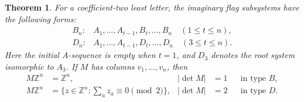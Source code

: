 \documentclass[11pt]{amsart}
\numberwithin{equation}{section}
\newtheorem{theorem}{Theorem}[section]
\theoremstyle{definition}
\newcommand{\Z}{\mathbb Z}
\begin{document}
\begin{theorem}\label{thm:orthogonal-flags}
For a coefficient-two least letter, the imaginary flag subsystems have the following forms:
\[
 \begin{array}{ll}
 B_n:&A_1,\ldots,A_{t-1},B_t,\ldots,B_n\quad(1\leq t\leq n),\\
 D_n:&A_1,\ldots,A_{t-1},D_t,\ldots,D_n\quad(3\leq t\leq n).
 \end{array}
\]
Here the initial $A$-sequence is empty when $t=1$, and $D_3$ denotes the root system isomorphic to $A_3$. If $M$ has columns $v_1,\ldots,v_n$, then
\begin{align}
 M\Z^n&=\Z^n,& |\det M|&=1&&\text{in type }B,\label{eq:B-lattice}\\
 M\Z^n&=\{z\in\Z^n:\textstyle\sum_a z_a\equiv0\pmod2\},
 &|\det M|&=2&&\text{in type }D.\label{eq:D-lattice}
\end{align}
\end{theorem}
\end{document}
